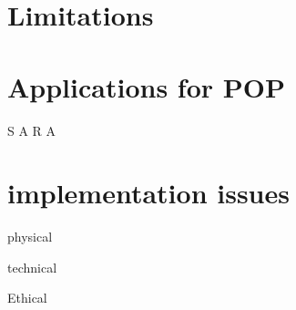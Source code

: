 \section{Limitations}


\section{Applications for POP}

S
A
R
A

\section{implementation issues}

physical

technical

Ethical


